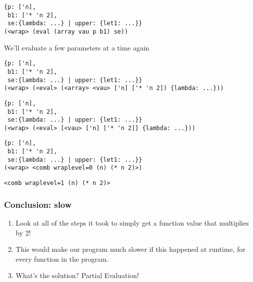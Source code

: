 \documentclass{beamer}
\begin{document}
\begin{frame}[fragile]
\footnotesize
\begin{verbatim}
{p: ['n],
 b1: ['* 'n 2],
 se:{lambda: ...} | upper: {let1: ...}}
(<wrap> (eval (array vau p b1) se))
\end{verbatim}
\end{frame}

\begin{frame}[fragile]
We'll evaluate a few parameters at a time again
\footnotesize
\begin{verbatim}
{p: ['n],
 b1: ['* 'n 2],
 se:{lambda: ...} | upper: {let1: ...}}
(<wrap> (<eval> (<array> <vau> ['n] ['* 'n 2]) {lambda: ...}))
\end{verbatim}
\end{frame}

\begin{frame}[fragile]
\footnotesize
\begin{verbatim}
{p: ['n],
 b1: ['* 'n 2],
 se:{lambda: ...} | upper: {let1: ...}}
(<wrap> (<eval> [<vau> ['n] ['* 'n 2]] {lambda: ...}))
\end{verbatim}
\end{frame}

\begin{frame}[fragile]
\footnotesize
\begin{verbatim}
{p: ['n],
 b1: ['* 'n 2],
 se:{lambda: ...} | upper: {let1: ...}}
(<wrap> <comb wraplevel=0 (n) (* n 2)>)
\end{verbatim}
\end{frame}

\begin{frame}[fragile]
\footnotesize
\begin{verbatim}
<comb wraplevel=1 (n) (* n 2)>
\end{verbatim}
\end{frame}

\begin{frame}
\frametitle{Conclusion: slow}
  \begin{enumerate}
	\item<1-> Look at all of the steps it took to simply get a function value that multiplies by 2!
    \item<2-> This would make our program much slower if this happened at runtime, for every function in the program.
	\item<3-> What's the solution? Partial Evaluation!
  \end{enumerate}
\end{frame}
\end{document}
